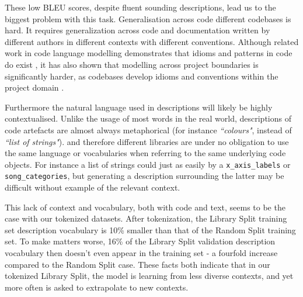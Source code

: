 These low BLEU scores, despite fluent sounding descriptions, lead us to the biggest problem with this task.
Generalisation across code different codebases is hard.  It requires generalization across code and documentation written by different authors in different contexts with different conventions. 
Although related work in code language modelling demonstrates that idioms and patterns in code do exist \citep{allamanis_mining_nodate}, it has also shown that modelling across project boundaries is significantly harder,
as codebases develop idioms and conventions within the project domain \citep{Hindle:2012:NS:2337223.2337322}. 

Furthermore the natural language used in descriptions will likely be highly contextualised. 
Unlike the usage of most words in the real world, descriptions of code artefacts are almost always metaphorical (for instance \textit{``colours"}, instead of \textit{``list of strings"}).  and therefore different libraries are under no obligation to use the same language or vocabularies when referring to the same underlying code objects. 
For instance a list of strings could just as easily by a \texttt{x_axis_labels} or \texttt{song_categories}, but generating a description surrounding the latter may be difficult without example of the relevant context.

This lack of context and vocabulary, both with code and text,  seems to be the case with our tokenized datasets.
After tokenization, the Library Split training set description vocabulary is 10\% smaller than that of the Random Split training set. To make matters worse, 16\% of the Library Split validation description vocabulary then doesn't even appear in the training set - a fourfold increase compared to the Random Split case.
These facts both indicate that in our tokenized Library Split, the model is learning from less diverse contexts, and yet more often is asked to extrapolate to new contexts.



